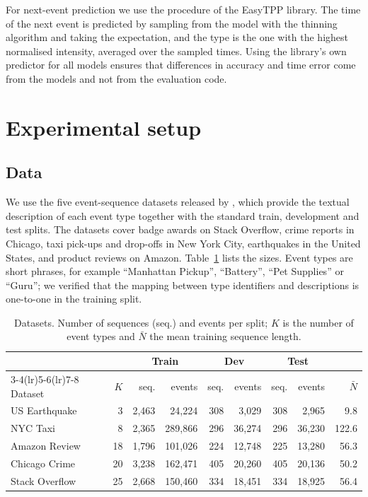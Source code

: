 \documentclass[preprint,12pt,authoryear]{elsarticle}
\begin{document}
For next-event prediction we use the procedure of the EasyTPP library. The time of the next event is predicted by sampling from the model with the thinning algorithm \citep{ogata1981lewis} and taking the expectation, and the type is the one with the highest normalised intensity, averaged over the sampled times. Using the library's own predictor for all models ensures that differences in accuracy and time error come from the models and not from the evaluation code.

\section{Experimental setup}
\label{sec:setup}

\subsection{Data}

We use the five event-sequence datasets released by \citet{liu2024tppllm}, which provide the textual description of each event type together with the standard train, development and test splits. The datasets cover badge awards on Stack Overflow, crime reports in Chicago, taxi pick-ups and drop-offs in New York City, earthquakes in the United States, and product reviews on Amazon. Table~\ref{tab:data} lists the sizes. Event types are short phrases, for example ``Manhattan Pickup'', ``Battery'', ``Pet Supplies'' or ``Guru''; we verified that the mapping between type identifiers and descriptions is one-to-one in the training split.

\begin{table}[t]
\centering
\caption{Datasets. Number of sequences (seq.) and events per split; $K$ is the number of event types and $\bar N$ the mean training sequence length.}
\label{tab:data}
\small
\begin{tabular}{lrrrrrrrr}
\toprule
 & & \multicolumn{2}{c}{Train} & \multicolumn{2}{c}{Dev} & \multicolumn{2}{c}{Test} & \\
\cmidrule(lr){3-4}\cmidrule(lr){5-6}\cmidrule(lr){7-8}
Dataset & $K$ & seq. & events & seq. & events & seq. & events & $\bar N$ \\
\midrule
US Earthquake & 3 & 2,463 & 24,224 & 308 & 3,029 & 308 & 2,965 & 9.8 \\
NYC Taxi & 8 & 2,365 & 289,866 & 296 & 36,274 & 296 & 36,230 & 122.6 \\
Amazon Review & 18 & 1,796 & 101,026 & 224 & 12,748 & 225 & 13,280 & 56.3 \\
Chicago Crime & 20 & 3,238 & 162,471 & 405 & 20,260 & 405 & 20,136 & 50.2 \\
Stack Overflow & 25 & 2,668 & 150,460 & 334 & 18,451 & 334 & 18,925 & 56.4 \\
\bottomrule
\end{tabular}
\end{table}
\end{document}

